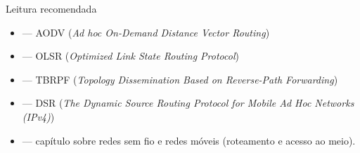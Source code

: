 \documentclass[aspectratio=169,11pt]{beamer}
\begin{document}
\begin{frame}{Leitura recomendada}
  \begin{itemize}
    \item {} --- AODV (\emph{Ad hoc On-Demand Distance Vector Routing})
    \item {} --- OLSR (\emph{Optimized Link State Routing Protocol})
    \item {} --- TBRPF (\emph{Topology Dissemination Based on Reverse-Path Forwarding})
    \item {} --- DSR (\emph{The Dynamic Source Routing Protocol for Mobile Ad Hoc Networks (IPv4)})
    \item \textbf{\kurose{}} --- capítulo sobre redes sem fio e redes móveis (roteamento e acesso ao meio).
  \end{itemize}
\end{frame}
\end{document}
